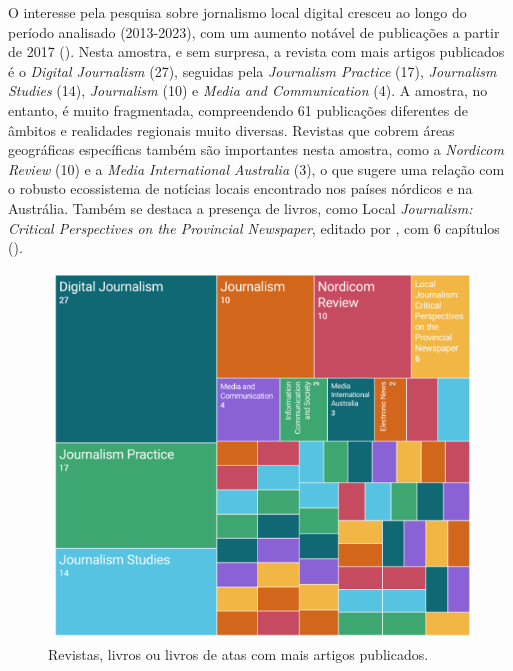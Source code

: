 \documentclass[portuguese]{textolivre}
\begin{document}
O interesse pela pesquisa sobre jornalismo local digital cresceu ao longo do período analisado (2013-2023), com um aumento notável de publicações a partir de 2017 (). Nesta amostra, e sem surpresa, a revista com mais artigos publicados é o \textit{Digital Journalism} (27), seguidas pela \textit{Journalism Practice} (17), \textit{Journalism Studies} (14), \textit{Journalism} (10) e \textit{Media and Communication} (4). A amostra, no entanto, é muito fragmentada, compreendendo 61 publicações diferentes de âmbitos e realidades regionais muito diversas. Revistas que cobrem áreas geográficas específicas também são importantes nesta amostra, como a \textit{Nordicom Review} (10) e a \textit{Media International Australia} (3), o que sugere uma relação com o robusto ecossistema de notícias locais encontrado nos países nórdicos e na Austrália. Também se destaca a presença de livros, como Local \textit{Journalism: Critical Perspectives on the Provincial Newspaper}, editado por \textcite{matthews2023}, com 6 capítulos ().

\begin{figure}[htbp]
\centering
\begin{minipage}{0.70\textwidth}
\includegraphics[width =\textwidth]{Imagens/Fig2.png}
\caption{Revistas, livros ou livros de atas com mais artigos publicados.}
\label{fig-2}
\end{minipage}
\end{figure}
\end{document}
